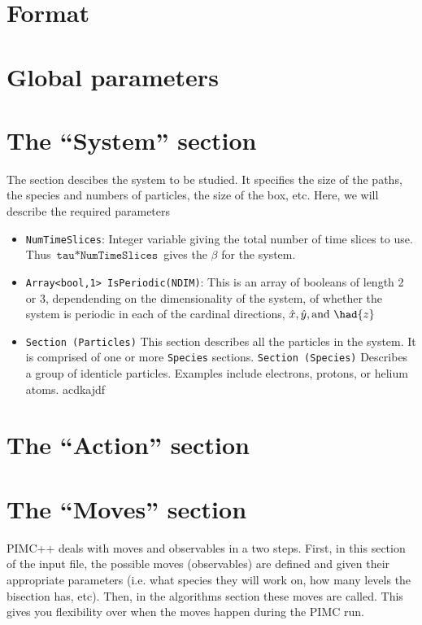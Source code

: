 \documentclass{book}
\begin{document}
\section{Format}
\section{Global parameters}
\section{The ``System'' section}
   The section descibes the system to be studied.  It specifies the
   size of the paths, the species and numbers of particles, the size
   of the box, etc.  Here, we will describe the required parameters
\begin{itemize}
   \item \texttt{NumTimeSlices}:  Integer variable giving the total
   number of time slices to use.  Thus
   $\texttt{tau}*\texttt{NumTimeSlices}$ gives the $\beta$ for the
   system.
   \item \texttt{Array<bool,1> IsPeriodic(NDIM)}:  This is an array of
   booleans of length 2 or 3, dependending on the dimensionality of
   the system, of whether the system is periodic in each of the
   cardinal directions, $\hat{x},\hat{y},\text{and } \had{z}$
   \item \texttt{Section (Particles)}  This section describes all the
   particles in the system.  It is comprised of one or more
   \texttt{Species} sections.
     \subitem \texttt{Section (Species)}  Describes a group of
        identicle particles.  Examples include electrons, protons,
        or helium atoms.
        \subsubitem acdkajdf
\end{itemize}

\section{The ``Action'' section}
\section{The ``Moves'' section}
PIMC++ deals with moves and observables in a two steps. First, in this
section of the input file, the possible moves (observables) are
defined and given their appropriate parameters (i.e. what species they
will work on, how many levels the bisection has, etc).  Then, in the
algorithms section these moves are called.  This gives you flexibility
over when the moves happen during the PIMC run.  
\end{document}
